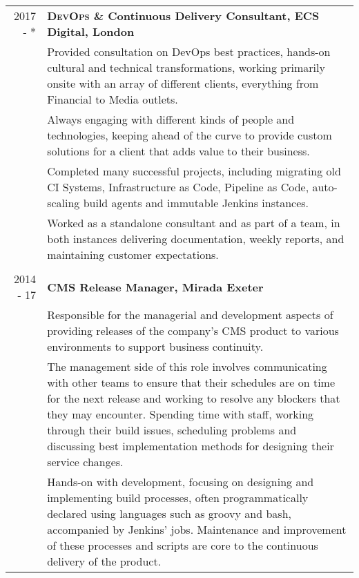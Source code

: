 \documentclass[a4paper,12pt,final,sans]{memoir}
\begin{document}
\begin{longtable}{r p{16cm}}
2017 - * \space & \textbf{\textsf{\color{head} \textsc{DevOps} \& Continuous Delivery Consultant, \textsc{ECS} Digital, London}}\\[0.3em]
& Provided consultation on DevOps best practices, hands-on cultural and technical transformations, working primarily onsite with an array of different clients, everything from Financial to Media outlets. \\[0.4em]

& Always engaging with different kinds of people and technologies, keeping ahead of the curve to provide custom solutions for a client that adds value to their business. \\[0.4em]

& Completed many successful projects, including migrating old CI Systems, Infrastructure as Code, Pipeline as Code, auto-scaling build agents and immutable Jenkins instances. \\[0.4em]

& Worked as a standalone consultant and as part of a team, in both instances delivering documentation, weekly reports, and maintaining customer expectations. \\[0.4em]
\\[0.5em]
\pagebreak

2014 - 17 & \textbf{\textsf{\color{head} \textsc{CMS} Release Manager, Mirada Exeter}}\\[0.3em]
	& Responsible for the managerial and development aspects of providing releases of the company's CMS product to various environments to support business continuity.  \\[0.4em]

	& The management side of this role involves communicating with other teams to ensure that their schedules are on time for the next release and working to resolve any blockers that they may encounter. Spending time with staff, working through their build issues, scheduling problems and discussing best implementation methods for designing their service changes.  \\[0.4em]

	& Hands-on with development, focusing on designing and implementing build processes, often programmatically declared using languages such as groovy and bash, accompanied by Jenkins’ jobs. Maintenance and improvement of these processes and scripts are core to the continuous delivery of the product. \\[0.4em]


\end{longtable}
\end{document}
